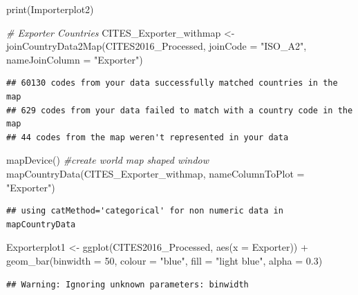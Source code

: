 \documentclass[
  12pt,
]{article}
\newenvironment{Shaded}{\begin{snugshade}}{\end{snugshade}}
\newcommand{\AttributeTok}[1]{\textcolor[rgb]{0.77,0.63,0.00}{#1}}
\newcommand{\CommentTok}[1]{\textcolor[rgb]{0.56,0.35,0.01}{\textit{#1}}}
\newcommand{\DecValTok}[1]{\textcolor[rgb]{0.00,0.00,0.81}{#1}}
\newcommand{\FloatTok}[1]{\textcolor[rgb]{0.00,0.00,0.81}{#1}}
\newcommand{\FunctionTok}[1]{\textcolor[rgb]{0.00,0.00,0.00}{#1}}
\newcommand{\NormalTok}[1]{#1}
\newcommand{\OtherTok}[1]{\textcolor[rgb]{0.56,0.35,0.01}{#1}}
\newcommand{\SpecialCharTok}[1]{\textcolor[rgb]{0.00,0.00,0.00}{#1}}
\newcommand{\StringTok}[1]{\textcolor[rgb]{0.31,0.60,0.02}{#1}}
\begin{document}
\begin{Shaded}
\begin{Highlighting}[]
\FunctionTok{print}\NormalTok{(Importerplot2)}

\CommentTok{\# Exporter Countries}
\NormalTok{CITES\_Exporter\_withmap }\OtherTok{\textless{}{-}} \FunctionTok{joinCountryData2Map}\NormalTok{(CITES2016\_Processed, }\AttributeTok{joinCode =} \StringTok{"ISO\_A2"}\NormalTok{,}
    \AttributeTok{nameJoinColumn =} \StringTok{"Exporter"}\NormalTok{)}
\end{Highlighting}
\end{Shaded}

\begin{verbatim}
## 60130 codes from your data successfully matched countries in the map
## 629 codes from your data failed to match with a country code in the map
## 44 codes from the map weren't represented in your data
\end{verbatim}

\begin{Shaded}
\begin{Highlighting}[]
\FunctionTok{mapDevice}\NormalTok{()  }\CommentTok{\#create world map shaped window}
\FunctionTok{mapCountryData}\NormalTok{(CITES\_Exporter\_withmap, }\AttributeTok{nameColumnToPlot =} \StringTok{"Exporter"}\NormalTok{)}
\end{Highlighting}
\end{Shaded}

\begin{verbatim}
## using catMethod='categorical' for non numeric data in mapCountryData
\end{verbatim}

\begin{Shaded}
\begin{Highlighting}[]
\NormalTok{Exporterplot1 }\OtherTok{\textless{}{-}} \FunctionTok{ggplot}\NormalTok{(CITES2016\_Processed, }\FunctionTok{aes}\NormalTok{(}\AttributeTok{x =}\NormalTok{ Exporter)) }\SpecialCharTok{+} \FunctionTok{geom\_bar}\NormalTok{(}\AttributeTok{binwidth =} \DecValTok{50}\NormalTok{,}
    \AttributeTok{colour =} \StringTok{"blue"}\NormalTok{, }\AttributeTok{fill =} \StringTok{"light blue"}\NormalTok{, }\AttributeTok{alpha =} \FloatTok{0.3}\NormalTok{)}
\end{Highlighting}
\end{Shaded}

\begin{verbatim}
## Warning: Ignoring unknown parameters: binwidth
\end{verbatim}
\end{document}
